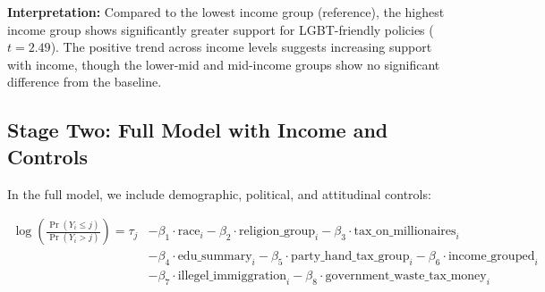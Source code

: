 \documentclass{article}
\begin{document}
\noindent
\textbf{Interpretation:} Compared to the lowest income group (reference), the highest income group shows significantly greater support for LGBT-friendly policies (\( t = 2.49 \)). The positive trend across income levels suggests increasing support with income, though the lower-mid and mid-income groups show no significant difference from the baseline.

\subsection{Stage Two: Full Model with Income and Controls}

In the full model, we include demographic, political, and attitudinal controls:

\[
\begin{aligned}
\log \left( \frac{\Pr(Y_i \leq j)}{\Pr(Y_i > j)} \right) = \tau_j & - \beta_1 \cdot \text{race}_i 
- \beta_2 \cdot \text{religion\_group}_i 
- \beta_3 \cdot \text{tax\_on\_millionaires}_i \\
& - \beta_4 \cdot \text{edu\_summary}_i
- \beta_5 \cdot \text{party\_hand\_tax\_group}_i
- \beta_6 \cdot \text{income\_grouped}_i \\
& - \beta_7 \cdot \text{illegel\_immiggration}_i
- \beta_8 \cdot \text{government\_waste\_tax\_money}_i
\end{aligned}
\]
\end{document}
